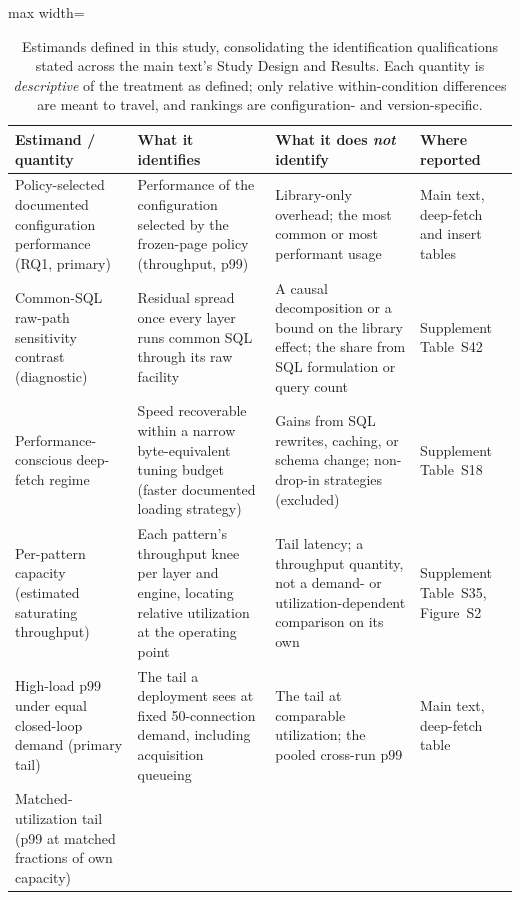 \begin{table}[htbp]
  \centering
  \small
  \caption{Estimands defined in this study, consolidating the identification qualifications
    stated across the main text's Study Design and Results. Each quantity is
    \emph{descriptive} of the treatment as defined; only relative within-condition differences are
    meant to travel, and rankings are configuration- and version-specific.}
  \label{tab:estimands}
  \begin{adjustbox}{max width=\textwidth}
  \begin{tabular}{@{}p{2.7cm} p{4.0cm} p{4.0cm} p{2.7cm}@{}}
    \toprule
    \textbf{Estimand / quantity} & \textbf{What it identifies} & \textbf{What it does \emph{not} identify} & \textbf{Where reported} \\
    \midrule
    Policy-selected documented configuration performance (RQ1, primary) &
    Performance of the configuration selected by the frozen-page policy (throughput, p99) &
    Library-only overhead; the most common or most performant usage &
    Main text, deep-fetch and insert tables \\
    \addlinespace
    Common-SQL raw-path sensitivity contrast (diagnostic) &
    Residual spread once every layer runs common SQL through its raw facility &
    A causal decomposition or a bound on the library effect; the share from SQL formulation or query count &
    Supplement Table~S42 \\
    \addlinespace
    Performance-conscious deep-fetch regime &
    Speed recoverable within a narrow byte-equivalent tuning budget (faster documented loading strategy) &
    Gains from SQL rewrites, caching, or schema change; non-drop-in strategies (excluded) &
    Supplement Table~S18 \\
    \addlinespace
    Per-pattern capacity (estimated saturating throughput) &
    Each pattern's throughput knee per layer and engine, locating relative utilization at the operating point &
    Tail latency; a throughput quantity, not a demand- or utilization-dependent comparison on its own &
    Supplement Table~S35, Figure~S2 \\
    \addlinespace
    High-load p99 under equal closed-loop demand (primary tail) &
    The tail a deployment sees at fixed 50-connection demand, including acquisition queueing &
    The tail at comparable utilization; the pooled cross-run p99 &
    Main text, deep-fetch table \\
    \addlinespace
    Matched-utilization tail (p99 at matched fractions of own capacity) &

\end{tabular}
\end{adjustbox}
\end{table}
